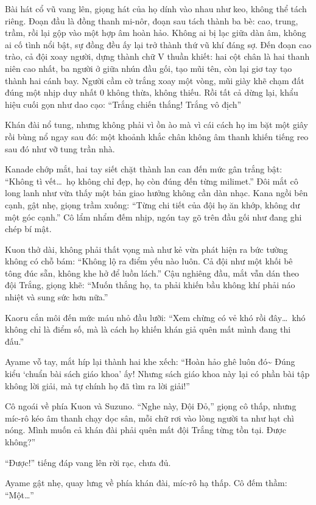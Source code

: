 \documentclass[../main.tex]{subfiles}
\begin{document}
Bài hát cổ vũ vang lên, giọng hát của họ dính vào nhau như keo, không thể tách riêng. Đoạn đầu là đồng thanh mi-nôr, đoạn sau tách thành ba bè: cao, trung, trầm, rồi lại gộp vào một hợp âm hoàn hảo. Không ai bị lạc giữa dàn âm, không ai cố tình nổi bật, sự đồng đều ấy lại trở thành thứ vũ khí đáng sợ. Đến đoạn cao trào, cả đội xoay người, dựng thành chữ V thuần khiết: hai cột chân là hai thanh niên cao nhất, ba người ở giữa nhún đầu gối, tạo mũi tên, còn lại giơ tay tạo thành hai cánh bay. Người cầm cờ trắng xoay một vòng, mũi giày khẽ chạm đất đúng một nhịp duy nhất 0 không thừa, không thiếu. Rồi tất cả dừng lại, khẩu hiệu cuối gọn như dao cạo: ``Trắng chiến thắng! Trắng vô địch''

Khán đài nổ tung, nhưng không phải vì ồn ào mà vì cái cách họ im bặt một giây rồi bùng nổ ngay sau đó: một khoảnh khắc chân không âm thanh khiến tiếng reo sau đó như vỡ tung trần nhà.

Kanade chớp mắt, hai tay siết chặt thành lan can đến mức gân trắng bật: ``Không tì vết\dots\ họ không chỉ đẹp, họ còn đúng đến từng milimet.'' Đôi mắt cô long lanh như vừa thấy một bản giao hưởng không cần dàn nhạc. Kana ngồi bên cạnh, gật nhẹ, giọng trầm xuống: ``Từng chi tiết của đội họ ăn khớp, không dư một góc cạnh.'' Cô lẩm nhẩm đếm nhịp, ngón tay gõ trên đầu gối như đang ghi chép bí mật.

Kuon thở dài, không phải thất vọng mà như kẻ vừa phát hiện ra bức tường không có chỗ bám: ``Không lộ ra điểm yếu nào luôn. Cả đội như một khối bê tông đúc sẵn, không khe hở để luồn lách.'' Cậu nghiêng đầu, mắt vẫn dán theo đội Trắng, giọng khẽ: ``Muốn thắng họ, ta phải khiến bầu không khí phải náo nhiệt và sung sức hơn nữa.''

Kaoru cắn môi đến mức máu nhỏ đầu lưỡi: ``Xem chừng có vẻ khó rồi đây\dots\ khó không chỉ là điểm số, mà là cách họ khiến khán giả quên mất mình đang thi đấu.''

Ayame vỗ tay, mắt híp lại thành hai khe xếch: ``Hoàn hảo ghê luôn đó\~{} Đúng kiểu `chuẩn bài sách giáo khoa' ấy! Nhưng sách giáo khoa này lại có phần bài tập không lời giải, mà tự chính họ đã tìm ra lời giải!''

Cô ngoái về phía Kuon và Suzuno. ``Nghe này, Đội Đỏ,'' giọng cô thấp, nhưng míc-rô kéo âm thanh chạy dọc sân, mỗi chữ rơi vào lòng người ta như hạt chì nóng. Mình muốn cả khán đài phải quên mất đội Trắng từng tồn tại. Được không?''

``Được!'' tiếng đáp vang lên rời rạc, chưa đủ.

Ayame gật nhẹ, quay lưng về phía khán đài, míc-rô hạ thấp. Cô đếm thầm: ``Một\dots''
\end{document}
